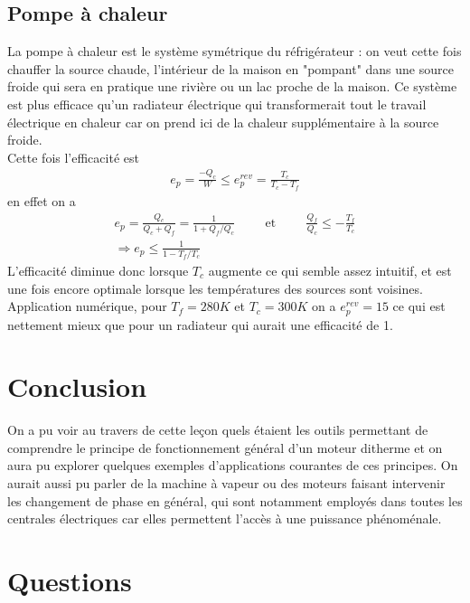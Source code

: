\documentclass[12pt,prb,aps,epsf]{report}
\begin{document}
\subsection{Pompe à chaleur}
La pompe à chaleur est le système symétrique du réfrigérateur : on veut cette fois chauffer la source chaude, l'intérieur de la maison en "pompant" dans une source froide qui sera en pratique une rivière ou un lac proche de la maison. Ce système est plus efficace qu'un radiateur électrique qui transformerait tout le travail électrique en chaleur car on prend ici de la chaleur supplémentaire à la source froide.\\
Cette fois l'efficacité est 
\begin{eqnarray}
e_p  = \frac{-Q_c}{W} \leq e_p^{rev} = \frac{T_c}{T_c-T_f}
\end{eqnarray}
en effet on a 
\begin{eqnarray}
e_p = \frac{Q_c}{Q_c+Q_f} = \frac{1}{1+Q_f/Q_c}\hspace{1cm}\mathrm{et}\hspace{1cm} \frac{Q_f}{Q_c} \leq -\frac{T_f}{T_c}\\
\Longrightarrow e_p \leq \frac{1}{1-T_f/T_c}
\end{eqnarray}
L'efficacité diminue donc lorsque $T_c$ augmente ce qui semble assez intuitif, et est une fois encore optimale lorsque les températures des sources sont voisines.\\
Application numérique, pour $T_f = 280K$ et $T_c=300K$ on a $e_p^{rev} = 15$ ce qui est nettement mieux que pour un radiateur qui aurait une efficacité de 1.

\section{Conclusion}
On a pu voir au travers de cette leçon quels étaient les outils permettant de comprendre le principe de fonctionnement général d'un moteur ditherme et on aura pu explorer quelques exemples d'applications courantes de ces principes. On aurait aussi pu parler de la machine à vapeur ou des moteurs faisant intervenir les changement de phase en général, qui sont notamment employés dans toutes les centrales électriques car elles permettent l'accès à une puissance phénoménale.

\section*{Questions}
\end{document}
